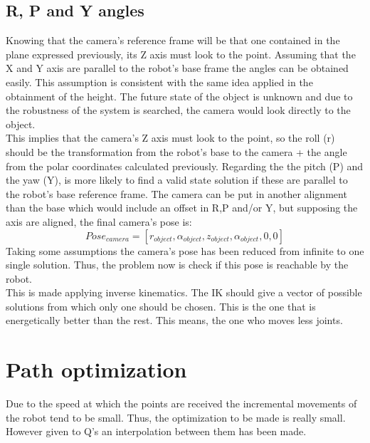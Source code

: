 \subsection{R, P and Y angles} %
\label{sub:r_p_and_y_angles}
Knowing that the camera's reference frame will be that one contained in the plane expressed previously, its Z axis must look to the point. 
Assuming that the X and Y axis are parallel to the robot's base frame the angles can be obtained easily.
This assumption is consistent with the same idea applied in the obtainment of the height. 
The future state of the object is unknown and due to the robustness of the system is searched, the camera would look directly to the object.\\

This implies that the camera's Z axis must look to the point, so the roll (r) should be the transformation from the robot's base to the camera + the angle from the polar coordinates calculated previously.
Regarding the the pitch (P) and the yaw (Y), is more likely to find a valid state solution if these are parallel to the robot's base reference frame. 
The camera can be put in another alignment than the base which would include an offset in R,P and/or Y, but supposing the axis are aligned, the final camera's pose is:
	\begin{equation}
		\label{eq:cameras_pose}
		Pose_{camera} = [r_{object},\alpha_{object},z_{object},\alpha_{object},0,0]
	\end{equation}
Taking some assumptions the camera's pose has been reduced from infinite to one single solution. Thus, the problem now is check if this pose is reachable by the robot.\\

This is made applying inverse kinematics. The IK should give a vector of possible solutions from which only one should be chosen. This is the one that is energetically better than the rest. This means, the one who moves less joints.


\section{Path optimization} %
\label{sec:path_optimization}
Due to the speed at which the points are received the incremental movements of the robot tend to be small. Thus, the optimization to be made is really small. However given to Q's an interpolation between them has been made.\\


